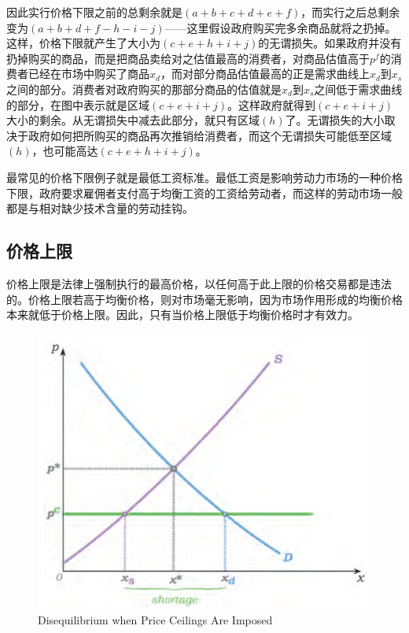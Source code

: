 \documentclass{article}
\begin{document}
因此实行价格下限之前的总剩余就是$ (a+b+c+d+e+f) $，而实行之后总剩余变为$ (a+b+d+f-h-i-j) $——这里假设政府购买完多余商品就将之扔掉。这样，价格下限就产生了大小为$ (c+e+h+i+j) $的无谓损失。如果政府并没有扔掉购买的商品，而是把商品卖给对之估值最高的消费者，对商品估值高于$ p^f $的消费者已经在市场中购买了商品$ x_d $，而对部分商品估值最高的正是需求曲线上$ x_d $到$ x_s $之间的部分。消费者对政府购买的那部分商品的估值就是$ x_d $到$ x_s $之间低于需求曲线的部分，在图中表示就是区域$ (c+e+i+j) $。这样政府就得到$ (c+e+i+j) $大小的剩余。从无谓损失中减去此部分，就只有区域$ (h) $了。无谓损失的大小取决于政府如何把所购买的商品再次推销给消费者，而这个无谓损失可能低至区域$ (h) $，也可能高达$ (c+e+h+i+j) $。

最常见的价格下限例子就是最低工资标准。最低工资是影响劳动力市场的一种价格下限，政府要求雇佣者支付高于均衡工资的工资给劳动者，而这样的劳动市场一般都是与相对缺少技术含量的劳动挂钩。

\subsection{价格上限}

价格上限是法律上强制执行的最高价格，以任何高于此上限的价格交易都是违法的。价格上限若高于均衡价格，则对市场毫无影响，因为市场作用形成的均衡价格本来就低于价格上限。因此，只有当价格上限低于均衡价格时才有效力。

\begin{figure}[H] %
	\centering %
	\includegraphics[width=1\textwidth]{18_7} %
	\caption{Disequilibrium when Price Ceilings Are Imposed} %
	\label{Fig.main8} %
\end{figure}
\end{document}
